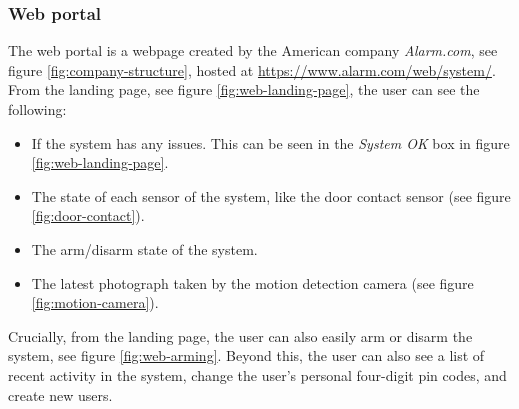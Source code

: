 \subsubsection{Web portal}
The web portal is a webpage created by the American company \textit{Alarm.com}, see figure \ref{fig:company-structure}, hosted at \url{https://www.alarm.com/web/system/}. From the landing page, see figure \ref{fig:web-landing-page}, the user can see the following:
\begin{itemize}
    \item If the system has any issues. This can be seen in the \textit{System OK} box in figure \ref{fig:web-landing-page}.
    \item The state of each sensor of the system, like the door contact sensor (see figure \ref{fig:door-contact}).
    \item The arm/disarm state of the system.
    \item The latest photograph taken by the motion detection camera (see figure \ref{fig:motion-camera}).
\end{itemize}
Crucially, from the landing page, the user can also easily arm or disarm the system, see figure \ref{fig:web-arming}. Beyond this, the user can also see a list of recent activity in the system, change the user's personal four-digit pin codes, and create new users.

